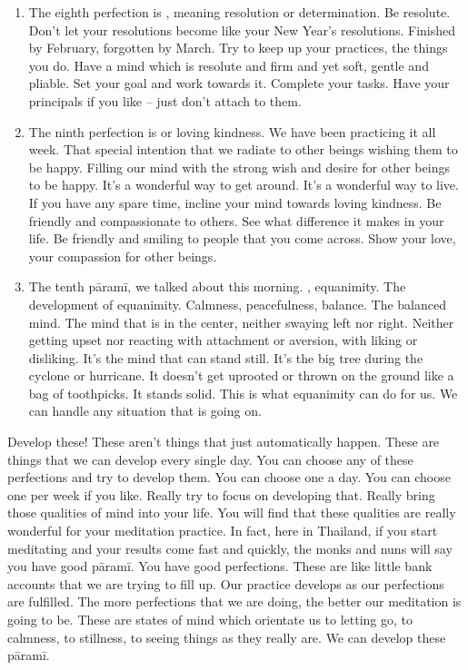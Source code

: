 \documentclass[letterpaper,10pt,english]{sphinxmanual}
\begin{document}
\begin{enumerate}
\item {} 
\sphinxAtStartPar
The eighth perfection is
, meaning resolution or determination. Be resolute. Don’t let your resolutions become like your New
Year’s  resolutions.  Finished  by  February,  forgotten  by  March. Try  to
keep up your practices, the things you do. Have a mind which is resolute and firm and yet soft, gentle and pliable. Set your goal and work
towards it. Complete your tasks. Have your principals if you like – just
don’t attach to them.

\item {} 
\sphinxAtStartPar
The  ninth  perfection  is
or  loving  kindness.  We  have  been
practicing  it  all  week. That  special  intention  that  we  radiate  to  other
beings wishing them to be happy. Filling our mind with the strong wish
and  desire  for  other  beings  to  be  happy.  It’s  a  wonderful  way  to  get
around. It’s a wonderful way to live. If you have any spare time, incline
your mind towards loving kindness. Be friendly and compassionate to
others. See what difference it makes in your life. Be friendly and smiling to people that you come across. Show your love, your compassion
for other beings.

\item {} 
\sphinxAtStartPar
The tenth pāramī, we talked about this morning.
, equanimity.
The development of equanimity. Calmness, peacefulness, balance. The
balanced mind. The mind that is in the center, neither swaying left nor
  right. Neither getting upset nor reacting with attachment or aversion,
with liking or disliking. It’s the mind that can stand still. It’s the big tree
during the cyclone or hurricane. It doesn’t get uprooted or thrown on
the ground like a bag of toothpicks. It stands solid. This is what equanimity can do for us. We can handle any situation that is going on.

\end{enumerate}

\sphinxAtStartPar
Develop  these!  These  aren’t  things  that  just  automatically  happen.
These are things that we can develop every single day. You can choose any
of these perfections and try to develop them. You can choose one a day. You
can choose one per week if you like. Really try to focus on developing that.
Really bring those qualities of mind into your life. You will find that these
qualities are really wonderful for your meditation practice. In fact, here in
Thailand, if you start meditating and your results come fast and quickly, the
monks and nuns will say you have good pāramī. You have good perfections.
These are like little bank accounts that we are trying to fill up. Our practice
develops as our perfections are fulfilled. The more perfections that we are
doing,  the  better  our  meditation  is  going  to  be.  These  are  states  of  mind
which orientate us to letting go, to calmness, to stillness, to seeing things as
they really are. We can develop these pāramī.
\end{document}

